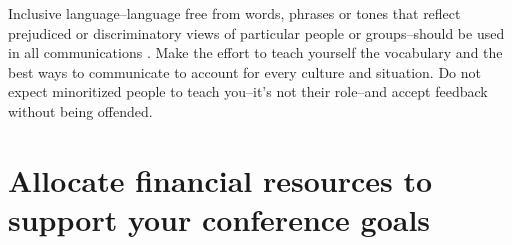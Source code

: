 \documentclass[10pt,letterpaper]{article}
\begin{document}
Inclusive language--language free from words, phrases or tones that reflect prejudiced or discriminatory views of particular people or groups--should be used in all communications \cite{hallDesigningDiversityInclusion2019}.
Make the effort to teach yourself the vocabulary and the best ways to communicate to account for every culture and situation. 
Do not expect minoritized people to teach you--it's not their role--and accept feedback without being offended.



\section{Allocate financial resources to support your conference goals}
\label{rule_financial}
\end{document}
